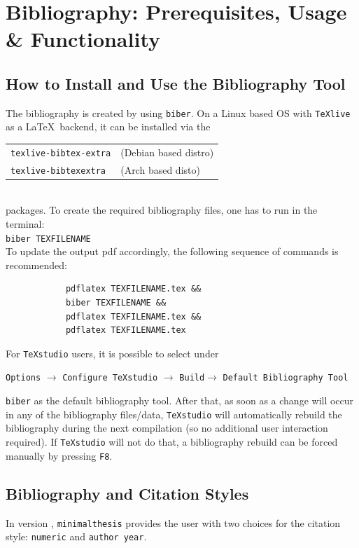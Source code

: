\chapter{Bibliography: Prerequisites, Usage \& Functionality}
	\section{How to Install and Use the Bibliography Tool}
		The bibliography is created by using \verb|biber|. On a Linux based OS with \verb|TeXlive| as a \LaTeX~backend, it can be installed via the\\[0.125cm]
		\begin{tabular}{ll}
			\verb|texlive-bibtex-extra|& (Debian based distro)\\
			\verb|texlive-bibtexextra|& (Arch based disto)
		\end{tabular}\\
		packages.
		\newline To create the required bibliography files, one has to run in the terminal:\\
		\verb|biber TEXFILENAME|\\
		To update the output pdf accordingly, the following sequence of commands is recommended:\\[-1cm]
		\begin{verbatim}
			pdflatex TEXFILENAME.tex &&
			biber TEXFILENAME &&
			pdflatex TEXFILENAME.tex &&
			pdflatex TEXFILENAME.tex 
		\end{verbatim} 
		\vspace{-0.5cm}
		For \verb|TeXstudio| users, it is possible to select under\\[-1cm]
		\begin{center}
			\verb|Options| $\rightarrow$ 
			\verb|Configure TeXstudio| $\rightarrow$
			\verb|Build|$ \rightarrow$
			\verb|Default Bibliography Tool| 
		\end{center}
		\vspace{-0.5cm}
		\verb|biber| as the default bibliography tool. After that, as soon as a change will occur in any of the bibliography files/data, \verb|TeXstudio| will automatically rebuild the bibliography during the next compilation (so no additional user interaction required). If \verb|TeXstudio| will not do that, a bibliography rebuild can be forced manually by pressing \verb|F8|.
		
	\newpage
	\section{Bibliography and Citation Styles}
		In version \releaseVersion, \verb|minimalthesis| provides the user with two choices for the citation style: \verb|numeric| and \verb|author year|. 
		
